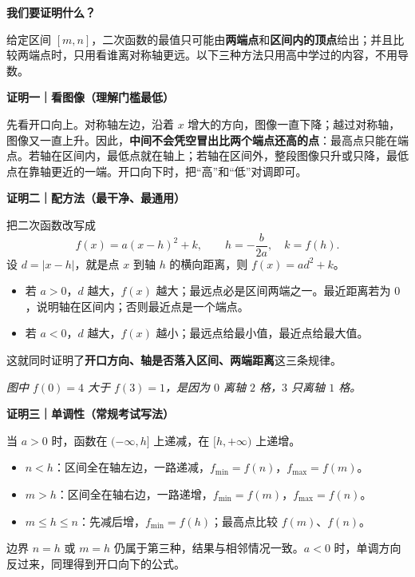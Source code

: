 \begin{proofbox}
\textbf{\textcolor{CProof}{我们要证明什么？}}

给定区间 $[m,n]$，二次函数的最值只可能由\textbf{两端点}和\textbf{区间内的顶点}给出；并且比较两端点时，只用看谁离对称轴更远。以下三种方法只用高中学过的内容，不用导数。

\medskip
\textbf{\textcolor{CProof}{证明一｜看图像（理解门槛最低）}}

先看开口向上。对称轴左边，沿着 $x$ 增大的方向，图像一直下降；越过对称轴，图像又一直上升。因此，\textbf{中间不会凭空冒出比两个端点还高的点}：最高点只能在端点。若轴在区间内，最低点就在轴上；若轴在区间外，整段图像只升或只降，最低点在靠轴更近的一端。开口向下时，把“高”和“低”对调即可。
\begin{center}

\end{center}

\medskip
\textbf{\textcolor{CProof}{证明二｜配方法（最干净、最通用）}}
\par\nopagebreak[4]

把二次函数改写成
\[
 f(x)=a(x-h)^2+k,\qquad h=-\frac{b}{2a},\quad k=f(h).
\]
设 $d=|x-h|$，就是点 $x$ 到轴 $h$ 的横向距离，则 $f(x)=ad^2+k$。
\begin{itemize}[leftmargin=*,itemsep=0.3em]
 \item 若 $a>0$，$d$ 越大，$f(x)$ 越大；最远点必是区间两端之一。最近距离若为 $0$，说明轴在区间内；否则最近点是一个端点。
 \item 若 $a<0$，$d$ 越大，$f(x)$ 越小；最远点给最小值，最近点给最大值。
\end{itemize}
这就同时证明了\textbf{开口方向、轴是否落入区间、两端距离}这三条规律。
\begin{center}

\end{center}
\textit{图中 $f(0)=4$ 大于 $f(3)=1$，是因为 $0$ 离轴 $2$ 格，$3$ 只离轴 $1$ 格。}

\medskip
\textbf{\textcolor{CProof}{证明三｜单调性（常规考试写法）}}

当 $a>0$ 时，函数在 $(-\infty,h]$ 上递减，在 $[h,+\infty)$ 上递增。
\begin{itemize}[leftmargin=*,itemsep=0.3em]
 \item $n<h$：区间全在轴左边，一路递减，$f_{\min}=f(n)$，$f_{\max}=f(m)$。
 \item $m>h$：区间全在轴右边，一路递增，$f_{\min}=f(m)$，$f_{\max}=f(n)$。
 \item $m\le h\le n$：先减后增，$f_{\min}=f(h)$；最高点比较 $f(m)$、$f(n)$。
\end{itemize}
边界 $n=h$ 或 $m=h$ 仍属于第三种，结果与相邻情况一致。$a<0$ 时，单调方向反过来，同理得到开口向下的公式。
\begin{center}

\end{center}


\end{proofbox}
